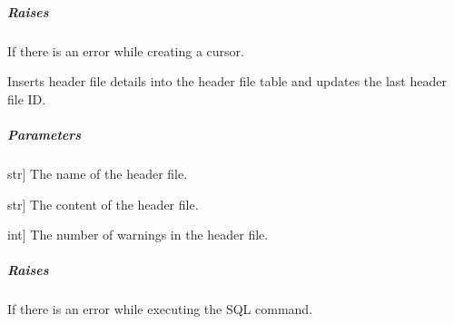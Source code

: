 \documentclass[letterpaper,10pt,english]{sphinxmanual}
\begin{document}
\begin{fulllineitems}
\begin{fulllineitems}
\subparagraph{Raises}
\label{\detokenize{main.db_operations:id1}}\begin{description}
\sphinxAtStartPar
If there is an error while creating a cursor.

\end{description}

\end{fulllineitems}


\begin{fulllineitems}
\label{\detokenize{main.db_operations:main.db_operations.db_insertion_handler.DBInsertionHandler.insert_into_header_file_table}}
\pysigstartsignatures
{}
\pysigstopsignatures
\sphinxAtStartPar
Inserts header file details into the header file table and updates the last header file ID.


\subparagraph{Parameters}
\label{\detokenize{main.db_operations:parameters}}\begin{description}
\sphinxlineitem{file\_name}{[}str{]}
\sphinxAtStartPar
The name of the header file.

\sphinxlineitem{file\_content}{[}str{]}
\sphinxAtStartPar
The content of the header file.

\sphinxlineitem{number\_of\_warnings}{[}int{]}
\sphinxAtStartPar
The number of warnings in the header file.

\end{description}


\subparagraph{Raises}
\label{\detokenize{main.db_operations:id2}}\begin{description}
\sphinxAtStartPar
If there is an error while executing the SQL command.

\end{description}

\end{fulllineitems}



\end{fulllineitems}
\end{document}
